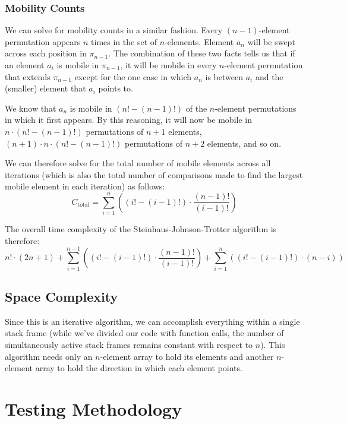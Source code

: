 \documentclass[10pt, oneside]{article}   	%
\begin{document}
\subsubsection{Mobility Counts}

We can solve for mobility counts in a similar fashion. Every $(n - 1)$-element permutation appears $n$ times in the set of $n$-elements. Element $a_{n}$ will be swept across each position in $\pi_{n - 1}$. The combination of these two facts tells us that if an element $a_{i}$ is mobile in $\pi_{n - 1}$, it will be mobile in every $n$-element permutation that extends $\pi_{n - 1}$ except for the one case in which $a_{n}$ is between $a_{i}$ and the (smaller) element that $a_{i}$ points to.

We know that $a_{n}$ is mobile in $(n! - (n - 1)!)$ of the $n$-element permutations in which it first appears. By this reasoning, it will now be mobile in $n \cdot (n! - (n - 1)!)$ permutations of $n + 1$ elements, $(n + 1) \cdot n \cdot (n! - (n - 1)!)$ permutations of $n + 2$ elements, and so on.

We can therefore solve for the total number of mobile elements across all iterations (which is also the total number of comparisons made to find the largest mobile element in each iteration) as follows:
\[
	C_{\text{total}} = \sum_{i = 1}^{n} \left( \left( i! - (i - 1)! \right) \cdot \frac{(n - 1)!}{(i - 1)!} \right)
\]

The overall time complexity of the Steinhaus-Johnson-Trotter algorithm is therefore:
\[
	n! \cdot (2n + 1)+ \sum_{i = 1}^{n - 1} \left( \left( i! - (i - 1)! \right) \cdot \frac{(n - 1)!}{(i - 1)!} \right) + \sum_{i = 1}^{n} \left( \left(i! - (i - 1)! \right) \cdot \left( n - i \right) \right) 
\]

\subsection{Space Complexity}

Since this is an iterative algorithm, we can accomplish everything within a single stack frame (while we've divided our code with function calls, the number of simultaneously active stack frames remains constant with respect to $n$). This algorithm needs only an $n$-element array to hold its elements and another $n$-element array to hold the direction in which each element points.

\section{Testing Methodology}
\end{document}
